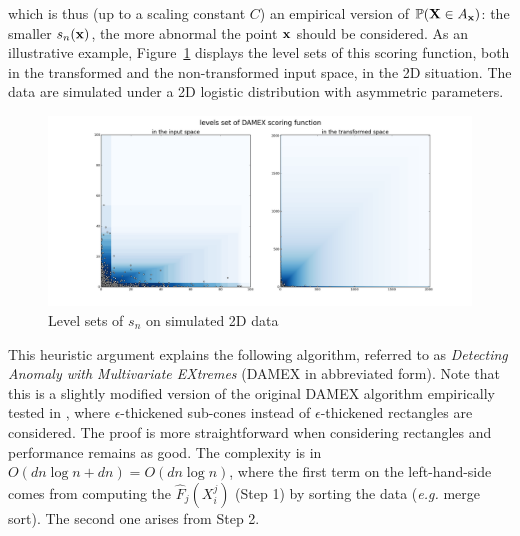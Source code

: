 which is thus (up to a scaling constant $C$) an empirical version of $\mathbb{P}(\mathbf X\in A_{\mathbf x})$: the smaller $s_n(\mathbf x)$, the more abnormal the point $\mathbf x$ should be considered.
As an illustrative example, Figure~\ref{jmva:DAMEX-2D} displays the level
sets of this scoring function, both in the transformed and the non-transformed input space, in the 2D situation. The data are simulated under a 2D logistic distribution with asymmetric parameters. 
\begin{figure}[!ht]
\centering
\includegraphics[scale=0.2331]{fig_source/plot_damex_level_sets.png}
\caption{Level sets of $s_n$ on simulated 2D data}
\label{jmva:DAMEX-2D}
\end{figure}

 This heuristic argument explains the following algorithm, referred to as {\it Detecting Anomaly with Multivariate EXtremes}  (DAMEX in abbreviated form). Note that this is a slightly modified version of the original DAMEX algorithm empirically tested in \cite{AISTAT16}, where $\epsilon$-thickened sub-cones instead of $\epsilon$-thickened rectangles are considered. The proof is more straightforward when considering rectangles and performance remains as good.
The complexity is in $O( dn\log n + dn) = O(dn\log n)$, where the first term on the left-hand-side comes from  computing the $\widehat F_j(X_i^j)$ (Step 1) by sorting  the data (\emph{e.g.} merge sort). The second one arises from Step 2. 

